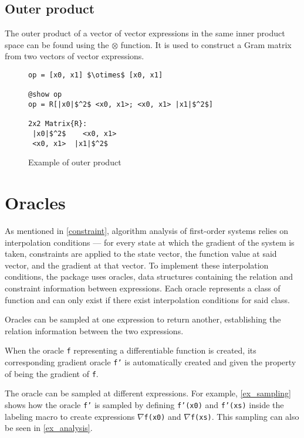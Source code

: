 \subsection*{Outer product}
The outer product of a vector of vector expressions in the same inner product space can be found using the $\otimes$ function. It is used to construct a Gram matrix from two vectors of vector expressions.

\begin{figure}[!h]
	\begin{lstlisting}[mathescape]
op = [x0, x1] $\otimes$ [x0, x1]

@show op
op = R[|x0|$^2$ <x0, x1>; <x0, x1> |x1|$^2$]

2x2 Matrix{R}:
 |x0|$^2$    <x0, x1>
 <x0, x1>  |x1|$^2$

\end{lstlisting}
\caption{Example of outer product}
\label{ex_outerproduct}
\end{figure}

\section{Oracles} \label{sec:oracles}

As mentioned in \cref{constraint}, algorithm analysis of first-order systems relies on interpolation conditions --- for every state at which the gradient of the system is taken, constraints are applied to the state vector, the function value at said vector, and the gradient at that vector. To implement these interpolation conditions, the package uses oracles, data structures containing the relation and constraint information between expressions. Each oracle represents a class of function and can only exist if there exist interpolation conditions for said class.

Oracles can be sampled at one expression to return another, establishing the relation information between the two expressions.

When the oracle \texttt{f} representing a differentiable function is created, its corresponding gradient oracle \texttt{f'} is automatically created and given the property of being the gradient of \texttt{f}.

The oracle can be sampled at different expressions. For example, \cref{ex_sampling} shows how the oracle \texttt{f'} is sampled by defining \texttt{f'(x0)} and \texttt{f'(xs)} inside the labeling macro to create expressions \texttt{$\nabla $f(x0)} and \texttt{$\nabla $f(xs)}. This sampling can also be seen in \cref{ex_analysis}.

